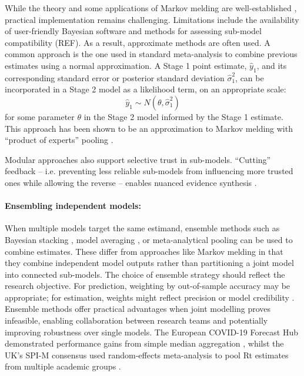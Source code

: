 \documentclass{article}
\begin{document}
While the theory and some applications of Markov melding are well-established \citep{goudie2019joining,nicholson2022interoperability,manderson2023combining}, practical implementation remains challenging. Limitations include the availability of user-friendly Bayesian software and methods for assessing sub-model compatibility (REF). As a result, approximate methods are often used. A common approach is the one used in standard meta-analysis \citep{borenstein2021introduction} to combine previous estimates using a normal approximation. A Stage 1 point estimate, $\hat{y}_1$, and its corresponding standard error or posterior standard deviation $\hat{\sigma}^2_1$, can be incorporated in a Stage 2 model as a likelihood term, on an appropriate scale:
$$
\hat{y}_1 \sim N(\theta, \hat{\sigma}^2_1)
$$ for some parameter $\theta$ in the Stage 2 model informed by the Stage 1 estimate. This approach has been shown to be an approximation to Markov melding with ``product of experts'' pooling \citep{goudie2019joining}.

Modular approaches also support selective trust in sub-models. ``Cutting'' feedback -- i.e. preventing less reliable sub-models from influencing more trusted ones while allowing the reverse -- enables nuanced evidence synthesis \citep{plummer2015cuts,carmona2022scalable,yu2023variational,liu2025general}.

\paragraph{Ensembling independent models:} When multiple models target the same estimand, ensemble methods such as Bayesian stacking \citep{yao2018using}, model averaging \citep{hoeting1999bayesian}, or meta-analytical pooling \citep{jackson2011multivariate} can be used to combine estimates.
These differ from approaches like Markov melding in that they combine independent model outputs rather than partitioning a joint model into connected sub-models.
The choice of ensemble strategy should reflect the research objective.
For prediction, weighting by out-of-sample accuracy may be appropriate; for estimation, weights might reflect precision or model credibility \citep{yao2018using}.
Ensemble methods offer practical advantages when joint modelling proves infeasible, enabling collaboration between research teams and potentially improving robustness over single models.
The European COVID-19 Forecast Hub demonstrated performance gains from simple median aggregation \citep{sherratt2021exploring}, whilst the UK's SPI-M consensus used random-effects meta-analysis to pool Rt estimates from multiple academic groups \citep{manley2024combining}.
\end{document}
